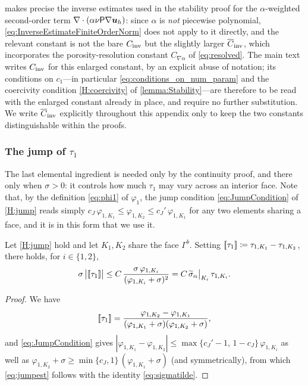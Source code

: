 \begin{remark}\label{rem:winvconst}
 makes precise the inverse estimates used in the stability proof for the
$\alpha$-weighted second-order term $\nabla\cdot(\alpha\nu\mathsf{P}\nabla\boldsymbol{u}_h)$: since
$\alpha$ is \emph{not} piecewise polynomial, \cref{eq:InverseEstimateFiniteOrderNorm} does not
apply to it directly, and the relevant constant is not the bare $C_{\mathrm{inv}}$ but the slightly larger
$\overline{C}_{\mathrm{inv}}$, which incorporates the porosity-resolution constant $C_{\nabla\alpha}$ of
\eqref{eq:resolved}. The main text writes $C_{\mathrm{inv}}$ for this enlarged constant, by an
explicit abuse of notation; its conditions on $c_1$---in particular
\cref{eq:conditions_on_num_param} and the coercivity condition \cref{H:coercivity} of
\cref{lemma:Stability}---are therefore to be read with the enlarged constant already in place,
and require no further substitution. We write $\overline{C}_{\mathrm{inv}}$ explicitly throughout this appendix
only to keep the two constants distinguishable within the proofs.
\end{remark}

\subsubsection{The jump of $\tau_1$}

The last elemental ingredient is needed only by the continuity proof, and there only when
$\sigma>0$: it controls how much $\tau_1$ may vary across an interior face. Note that, by the
definition \eqref{eq:phi1} of $\varphi_1$, the jump condition \cref{eq:JumpCondition} of
\cref{H:jump} reads simply
$c_J\,\varphi_{1,K_1}\le\varphi_{1,K_2}\le c_J'\,\varphi_{1,K_1}$ for any two elements sharing a
face, and it is in this form that we use it.

\begin{lemma}\label{lem:jump}
Let \cref{H:jump} hold and let $K_1,K_2$ share the face $\Gamma^b$. Setting
$[\![\tau_1]\!]\coloneqq\tau_{1,K_1}-\tau_{1,K_2}$, there holds, for $i\in\{1,2\}$,
\begin{equation}\label{eq:jumpest}
  \sigma\,\bigl|[\![\tau_1]\!]\bigr|
  \le C\,\frac{\sigma\,\varphi_{1,K_i}}{(\varphi_{1,K_i}+\sigma)^2}
  = C\,\widetilde{\sigma}_{\alpha}\big|_{K_i}\,\tau_{1,K_i}.
\end{equation}
\end{lemma}

\begin{proof}
We have
\begin{equation*}
  [\![\tau_1]\!]
  = \frac{\varphi_{1,K_2}-\varphi_{1,K_1}}
  {(\varphi_{1,K_1}+\sigma)(\varphi_{1,K_2}+\sigma)} ,
\end{equation*}
and \eqref{eq:JumpCondition} gives
$|\varphi_{1,K_1}-\varphi_{1,K_2}|\le
\max\{c_J'-1,\,1-c_J\}\,\varphi_{1,K_i}$ as well as
$\varphi_{1,K_2}+\sigma\ge \min\{c_J,1\}\,(\varphi_{1,K_1}+\sigma)$ (and symmetrically),
from which \eqref{eq:jumpest} follows with the identity \eqref{eq:sigmatilde}.
\end{proof}

